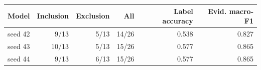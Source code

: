\begin{tabular}{lrrrrr}
\toprule
Model & Inclusion & Exclusion & All & Label accuracy & Evid. macro-F1 \\
\midrule
seed 42 & 9/13 & 5/13 & 14/26 & 0.538 & 0.827 \\
seed 43 & 10/13 & 5/13 & 15/26 & 0.577 & 0.865 \\
seed 44 & 9/13 & 6/13 & 15/26 & 0.577 & 0.865 \\
\bottomrule
\end{tabular}
